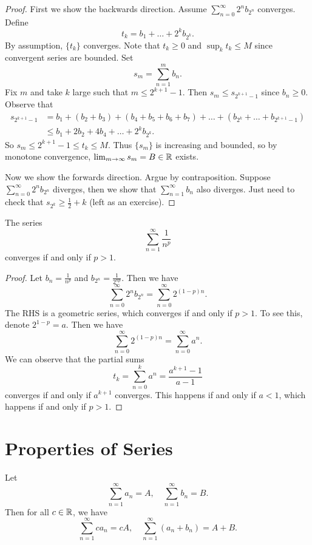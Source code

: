 \begin{proof}
  First we show the backwards direction.
  Assume $\sum_{n = 0}^\infty 2^n b_{2^n}$ converges.
  Define
  \[t_k = b_1 + \dots + 2^k b_{2^k}.\]
  By assumption, $\{t_k\}$ converges.
  Note that $t_k \ge 0$ and $\sup_k t_k \le M$ since
  convergent series are bounded. Set
  \[s_m = \sum_{n=1}^m b_n.\]
  Fix $m$ and take $k$ large such that $m \le 2^{k + 1} - 1$.
  Then $s_m \le s_{2^{k + 1} - 1}$ since $b_n \ge 0$.
  Observe that
  \begin{align*}
    s_{2^{k+1} - 1} &= b_1 + (b_2 + b_3) +
    (b_4 + b_5 + b_6 + b_7) + \dots
    + (b_{2^k} + \dots + b_{2^{k+1} - 1}) \\
    &\le b_1 + 2b_2 + 4b_4 + \dots + 2^k b_{2^k}.
  \end{align*}
  So $s_m \le 2^{k + 1} - 1 \le t_k \le M$.
  Thus $\{s_m\}$ is increasing and bounded, so
  by monotone convergence,
  $\lim_{m \to \infty} s_m = B \in \mathbb{R}$ exists.

  Now we show the forwards direction. Argue
  by contraposition.
  Suppose $\sum_{n = 0}^\infty 2^n b_{2^n}$
  diverges, then we show that $\sum_{n = 1}^\infty b_n$ also
  diverges. Just need to check that
  $s_{2^k} \ge \frac{1}{2} + k$ (left as an exercise).
\end{proof}

\begin{corollary}
  The series
  \[\sum_{n = 1}^\infty \frac{1}{n^p}\]
  converges if and only if $p > 1$.
\end{corollary}

\begin{proof}
  Let $b_n = \frac{1}{n^p}$ and $b_{2^n} = \frac{1}{2^{np}}$.
  Then we have
  \[\sum_{n=0}^\infty 2^n b_{2^n} = \sum_{n=0}^\infty 2^{(1 - p)n}.\]
  The RHS is a geometric series, which converges if and
  only if $p > 1$. To see this, denote $2^{1 - p} = a$.
  Then we have
  \[\sum_{n = 0}^\infty 2^{(1 - p)n} = \sum_{n = 0}^\infty a^n.\]
  We can observe that the partial sums
  \[t_k = \sum_{n=0}^k a^n = \frac{a^{k+1} - 1}{a - 1}\]
  converges if and only if $a^{k + 1}$ converges.
  This happens if and only if $a < 1$, which happens
  if and only if $p > 1$.
\end{proof}

\section{Properties of Series}
\begin{theorem}
  Let
  \[\sum_{n=1}^\infty a_n = A, \quad \sum_{n=1}^\infty b_n = B.\]
  Then for all $c \in \mathbb{R}$, we have
  \[
    \sum_{n=1}^\infty ca_n = cA, \quad
    \sum_{n=1}^\infty (a_n + b_n) = A + B
  .\]
\end{theorem}

